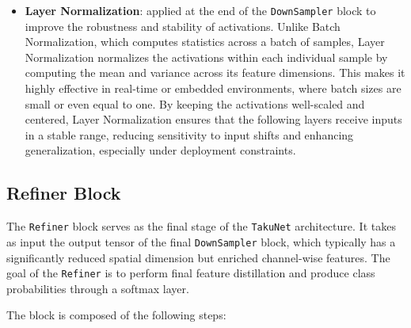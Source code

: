 \begin{itemize}
    \item \textbf{Layer Normalization}: applied at the end of the \texttt{DownSampler} block to improve the robustness and stability of activations. Unlike Batch Normalization, which computes statistics across a batch of samples, Layer Normalization normalizes the activations within each individual sample by computing the mean and variance across its feature dimensions. This makes it highly effective in real-time or embedded environments, where batch sizes are small or even equal to one. By keeping the activations well-scaled and centered, Layer Normalization ensures that the following layers receive inputs in a stable range, reducing sensitivity to input shifts and enhancing generalization, especially under deployment constraints.
    
\end{itemize}

\subsection{Refiner Block}

The \texttt{Refiner} block serves as the final stage of the \texttt{TakuNet} architecture. It takes as input the output tensor of the final \texttt{DownSampler} block, which typically has a significantly reduced spatial dimension but enriched channel-wise features. The goal of the \texttt{Refiner} is to perform final feature distillation and produce class probabilities through a softmax layer.

The block is composed of the following steps:

